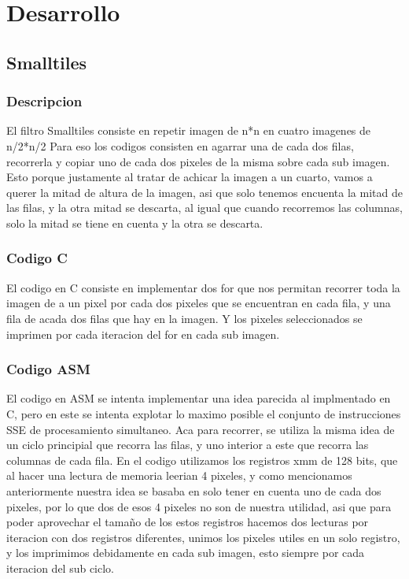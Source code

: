 \section{Desarrollo}
\subsection{Smalltiles}
\subsubsection{Descripcion}
El filtro Smalltiles consiste en repetir  imagen de n*n en cuatro imagenes de n/2*n/2
Para eso los codigos consisten en agarrar una de cada dos filas, recorrerla y copiar uno de cada dos pixeles de la misma sobre cada sub imagen. Esto porque justamente al tratar de achicar la imagen a un cuarto, vamos a querer la mitad de altura de la imagen, asi que solo tenemos encuenta la mitad de las filas, y la otra mitad se descarta, al igual que cuando recorremos las columnas, solo la mitad se tiene en cuenta y la otra se descarta.


\subsubsection{Codigo C}
El codigo en C consiste en implementar dos for que nos permitan recorrer toda la imagen de a un pixel por cada dos pixeles que se encuentran en cada fila, y una fila de acada dos filas que hay en la imagen. Y los pixeles seleccionados se imprimen por cada iteracion del for  en cada sub imagen.

\subsubsection{Codigo ASM} 
El codigo en ASM se intenta implementar una idea parecida al implmentado en C, pero en este se intenta explotar lo maximo posible el conjunto de instrucciones SSE de procesamiento simultaneo. Aca para recorrer, se utiliza la misma idea de un ciclo principial que recorra las filas, y uno interior a este que recorra las columnas de cada fila. En el codigo utilizamos los registros xmm de 128 bits,  que al hacer una lectura de memoria leerian 4 pixeles, y como mencionamos anteriormente nuestra idea se basaba en solo tener en cuenta uno de cada dos pixeles, por lo que dos de esos 4 pixeles no son de nuestra utilidad, asi que para poder aprovechar el tamaño de los estos registros hacemos dos lecturas por iteracion con dos registros diferentes, unimos los pixeles utiles en un solo registro, y los imprimimos debidamente en cada sub imagen, esto siempre por cada iteracion del sub ciclo.


